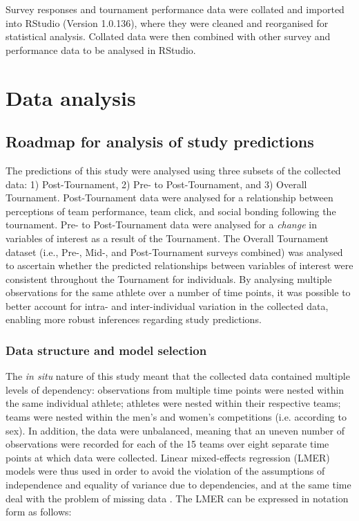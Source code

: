 \begin{CJK}{UTF8}{gbsn}
Survey responses and tournament performance data were collated and imported into RStudio (Version 1.0.136), where they were cleaned and reorganised for statistical analysis. Collated data were then combined with other survey and performance data to be analysed in RStudio.






\clearpage
\section{Data analysis}

\subsection{Roadmap for analysis of study predictions}
The predictions of this study were analysed using three subsets of the collected data: 1) Post-Tournament, 2) Pre- to Post-Tournament, and 3) Overall Tournament.  Post-Tournament data were analysed for a relationship between perceptions of team performance, team click, and social bonding following the tournament.  Pre- to Post-Tournament data were analysed for a \textit{change} in variables of interest as a result of the Tournament.  The Overall Tournament dataset (i.e., Pre-, Mid-, and Post-Tournament surveys combined) was analysed to ascertain whether the predicted relationships between variables of interest were consistent throughout the Tournament for individuals.  By analysing multiple observations for the same athlete over a number of time points, it was possible to better account for intra- and inter-individual variation in the collected data, enabling more robust inferences regarding study predictions.

\subsubsection{Data structure and model selection\label{survey:dataStructureModelSelection}}
The \textit{in situ} nature of this study meant that the collected data contained multiple levels of dependency: observations from multiple time points were nested within the same individual athlete; athletes were nested within their respective teams; teams were nested within the men’s and women’s competitions (i.e. according to sex).  In addition, the data were unbalanced, meaning that an uneven number of observations were recorded for each of the 15 teams over eight separate time points at which data were collected.  Linear mixed-effects regression (LMER) models were thus used in order to avoid the violation of the assumptions of independence and equality of variance due to dependencies, and at the same time deal with the problem of missing data \citep{Quene2004,Field2012}.  The LMER can be expressed in notation form as follows:


\end{CJK}
